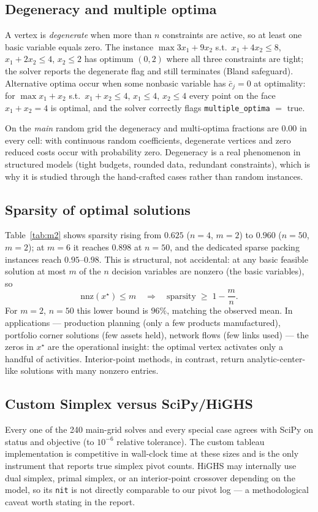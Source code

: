 \documentclass[10pt]{article}
\begin{document}
\subsection{Degeneracy and multiple optima}
A vertex is \emph{degenerate} when more than $n$ constraints are active, so
at least one basic variable equals zero.  The instance
$\max 3x_1+9x_2$ s.t.\ $x_1+4x_2\le 8$, $x_1+2x_2\le 4$, $x_2\le 2$ has
optimum $(0,2)$ where all three constraints are tight; the solver reports
the degenerate flag and still terminates (Bland safeguard).  Alternative
optima occur when some nonbasic variable has $\bar{c}_j=0$ at optimality:
for $\max x_1+x_2$ s.t.\ $x_1+x_2\le 4$, $x_1\le 4$, $x_2\le 4$ every point
on the face $x_1+x_2=4$ is optimal, and the solver correctly flags
\texttt{multiple\_optima} $=$ true.

On the \emph{main} random grid the degeneracy and multi-optima fractions are
$0.00$ in every cell: with continuous random coefficients, degenerate
vertices and zero reduced costs occur with probability zero.  Degeneracy is
a real phenomenon in structured models (tight budgets, rounded data,
redundant constraints), which is why it is studied through the hand-crafted
cases rather than random instances.

\subsection{Sparsity of optimal solutions}
Table~\ref{tab:m2} shows sparsity rising from $0.625$ ($n=4$, $m=2$) to
$0.960$ ($n=50$, $m=2$); at $m=6$ it reaches $0.898$ at $n=50$, and the
dedicated sparse packing instances reach $0.95$--$0.98$.
This is structural, not accidental: at any basic feasible solution at most
$m$ of the $n$ decision variables are nonzero (the basic variables), so
\begin{equation}
\mathrm{nnz}(x^\star) \le m \quad\Longrightarrow\quad
\text{sparsity} \;\ge\; 1 - \frac{m}{n}.
\end{equation}
For $m=2$, $n=50$ this lower bound is $96\%$, matching the observed mean.
In applications --- production planning (only a few products manufactured),
portfolio corner solutions (few assets held), network flows (few links
used) --- the zeros in $x^\star$ are the operational insight: the optimal
vertex activates only a handful of activities.  Interior-point methods, in
contrast, return analytic-center-like solutions with many nonzero entries.

\subsection{Custom Simplex versus SciPy/HiGHS}
Every one of the 240 main-grid solves and every special case agrees with
SciPy on status and objective (to $10^{-6}$ relative tolerance).  The
custom tableau implementation is competitive in wall-clock time at these
sizes and is the only instrument that reports true simplex pivot counts.
HiGHS may internally use dual simplex, primal simplex, or an interior-point
crossover depending on the model, so its \texttt{nit} is not directly
comparable to our pivot log --- a methodological caveat worth stating in
the report.
\end{document}
